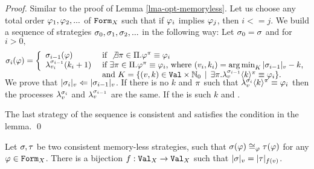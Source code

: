 \begin{proof}
Similar to the proof of Lemma \ref{lma-opt-memoryless}.
Let us choose any total order $\varphi_1, \varphi_2, ...$ of $\mathtt{Form}_X$ such that
if $\varphi_i$ implies $\varphi_j$, then $i <= j$.
We build a sequence of strategies $\sigma_0, \sigma_1, \sigma_2, ...$ in the following way:
Let $\sigma_0 = \sigma$ and for $i > 0,$
\begin{equation}
\stg_i(\form) = \left\{
 \begin{array}{lll}
 \stg_{i-1}(\form) & \textrm{ if } \not\exists\perm\in\symg.\form^\perm\equiv\form_i \\
 \procstg{\stg_{i-1}}{\val_i}(k_i + 1) &
    \textrm{ if } \exists\perm\in\symg.\form^\perm\equiv\form_i\textrm{, where }
    (v_i, k_i) = \argmin_K \stglen{\stg_{i-1}}{v} - k,\\
    & \textrm{ and }
    K = \{(v, k)\in\Val\times\Nseto \| \exists\perm.\stgknow{\stg_{i-1}}{v}{k}^\perm\equiv\form_i\}.
    \vspace{-2.5ex}
 \end{array}
 \right.
 \vspace{2.5ex}
\end{equation}
We prove that $|\sigma_{i}|_{v} <= |\sigma_{i-1}|_{v}$.
If there is no $k$ and $\pi$ such that $\lambda^{\sigma_i}_{v}\langle k\rangle^\pi\equiv\varphi_i$ then
  the processes $\lambda^{\sigma_i}_{v}$ and $\lambda^{\sigma_{i-1}}_{v}$ are the same.
If the is such $k$ and .

The last strategy of the sequence is consistent and satisfies the
  condition in the lemma. \qed
\end{proof}

\begin{theorem}
Let $\sigma, \tau$ be two consistent memory-less strategies, such that
$\sigma(\varphi) \cong_{\varphi} \tau(\varphi)$ for any $\varphi\in\mathtt{Form}_X$.
There is a bijection $f:\mathtt{Val}_X -> \mathtt{Val}_X$ such that
$|\sigma|_{v} = |\tau|_{f(v)}$.
\end{theorem}

